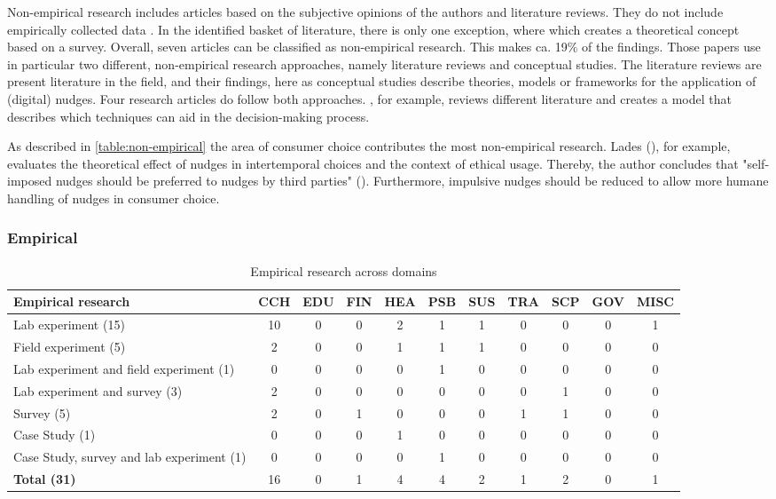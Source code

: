 Non-empirical research includes articles based on the subjective opinions of the authors and literature reviews. They do not include empirically collected data \cite{alavi_review_1992}. In the identified basket of literature, there is only one exception, where \cite{gamliel_average_2017} which creates a theoretical concept based on a survey. Overall, seven articles can be classified as non-empirical research. This makes ca. 19\% of the findings. Those papers use in particular two different, non-empirical research approaches, namely literature reviews and conceptual studies. The literature reviews are present literature in the field, and their findings, here as conceptual studies describe theories, models or frameworks for the application of (digital) nudges. Four research articles do follow both approaches. \cite{broniarczyk_decision_2014}, for example, reviews different literature and creates a model that describes which techniques can aid in the decision-making process.

As described in  \ref{table:non-empirical} the area of consumer choice contributes the most non-empirical research. Lades (\citeyear{lades_impulsive_2014}), for example, evaluates the theoretical effect of nudges in intertemporal choices and the context of ethical usage. Thereby, the author concludes that "self-imposed nudges should be preferred to nudges by third parties" (\cite[p.122]{lades_impulsive_2014}). Furthermore, impulsive nudges should be reduced to allow more humane handling of nudges in consumer choice.


\subsubsection{Empirical}
\begin{table}[htbp]
\small
\centering
\begin{tabular}{p{3.6cm}|cccccccccc}
\textbf{Empirical research} & \textbf{CCH} & \textbf{EDU} & \textbf{FIN} & \textbf{HEA} & \textbf{PSB} & \textbf{SUS} & \textbf{TRA} & \textbf{SCP} & \textbf{GOV} & \textbf{MISC} \\ \hline
Lab experiment (15) & 10 & 0 & 0 & 2 & 1 & 1 & 0 & 0 & 0 & 1 \\
Field experiment (5) & 2 & 0 & 0 & 1 & 1 & 1 & 0 & 0 & 0 & 0 \\
Lab experiment and field experiment (1) & 0 & 0 & 0 & 0 & 1 & 0 & 0 & 0 & 0 & 0 \\
Lab experiment and survey (3) & 2 & 0 & 0 & 0 & 0 & 0 & 0 & 1 & 0 & 0 \\
Survey (5) & 2 & 0 & 1 & 0 & 0 & 0 & 1 & 1 & 0 & 0 \\
Case Study (1) & 0 & 0 & 0 & 1 & 0 & 0 & 0 & 0 & 0 & 0 \\
Case Study, survey and lab experiment (1) & 0 & 0 & 0 & 0 & 1 & 0 & 0 & 0 & 0 & 0 \\ \hline
\textbf{Total (31)} & 16 & 0 & 1 & 4 & 4 & 2 & 1 & 2 & 0 & 1
\end{tabular}
\caption{Empirical research across domains}
\label{table:empirical}
\end{table}


